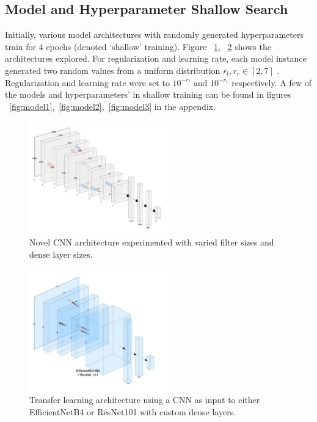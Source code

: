 \documentclass[10pt,twocolumn,letterpaper]{article}
\begin{document}
\subsection{Model and Hyperparameter Shallow Search}
Initially, various model architectures with randomly generated hyperparameters train for $4$ epochs (denoted `shallow' training). Figure ~\ref{fig:CNN}, ~\ref{fig:transfer} shows the architectures explored. For regularization and learning rate, each model instance generated two random values from a uniform distribution $r_l, r_r \in \left[ 2,7\right]$ . Regularization and learning rate were set to $10^{-r_l}$ and $10^{-r_r}$ respectively. A few of the models and hyperparameters' in shallow training can be found in figures ~\ref{fig:model1},~\ref{fig:model2},~\ref{fig:model3} in the appendix.
\begin{figure}[!htb]
    \centering

    \includegraphics[width=6cm]{latex/figs/CNN_architecture.jpeg}
    \caption{Novel CNN architecture experimented with varied filter sizes and dense layer sizes.}
    \label{fig:CNN}
\end{figure}

\begin{figure}
    \centering

    \includegraphics[width=6cm]{latex/figs/transfer_architecture.jpeg}
    \caption{Transfer learning architecture using a CNN as input to either EfficientNetB4 or ResNet101 with custom dense layers.}
    \label{fig:transfer}
\end{figure}
\end{document}
